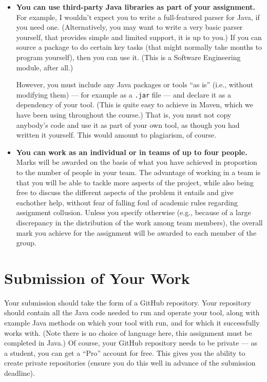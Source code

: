 \begin{itemize}
    \item {\bf You can use third-party Java libraries as part of your
    assignment.} For example, I wouldn't expect you to write a full-featured
    parser for Java, if you need one. (Alternatively, you may want to write a
    very basic parser yourself, that provides simple and limited support, it is
    up to you.)
    If you can source a package to do certain key tasks (that might normally
    take months to program yourself), then you can use it. (This is a Software
    Engineering module, after all.)
    
    However, you must include any Java packages or tools ``as is'' (i.e.,
    without modifying them) --- for example as a {\tt .jar} file --- and declare
    it as a dependency of your tool. (This is quite easy to achieve in Maven,
    which we have been using throughout the course.) That is, you must not copy
    anybody's code and use it as part of your own tool, as though you had
    written it yourself. This would amount to plagiarism, of course.

    \item {\bf You can work as an individual or in teams of up to four people.}    
    Marks will be awarded on the basis of what you have achieved in proportion
    to the number of people in your team. The advantage of working in a team is
    that you will be able to tackle more aspects of the project, while also
    being free to discuss the different aspects of the problem it entails and
    give eachother help, without fear of falling foul of academic rules
    regarding assignment collusion. Unless you specify otherwise (e.g., because
    of a large discrepancy in the distribution of the work among team members),
    the overall mark you achieve for the assignment will be awarded to each
    member of the group.
\end{itemize}


\section{Submission of Your Work}
\label{sec:submission}

Your submission should take the form of a GitHub repository. Your repository
should contain all the Java code needed to run and operate your tool, along with
example Java methods on which your tool with run, and for which it successfully
works with. (Note there is no choice of language here, this assignment must be
completed in Java.) Of course, your GitHub repository needs to be private --- as
a student, you can get a ``Pro'' account for free. This gives you the ability to
create private repositories (ensure you do this well in advance of the
submission deadline).

